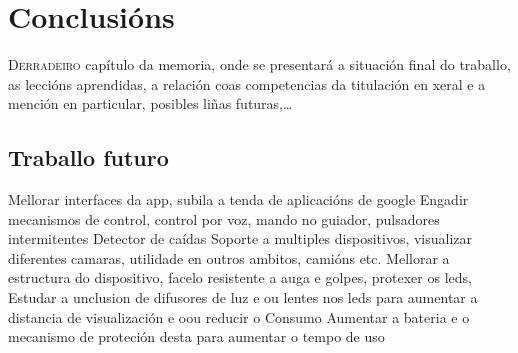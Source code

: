 \chapter{Conclusións}
\label{chap:conclusions}

\lettrine{D}{erradeiro} capítulo da memoria, onde se presentará a
situación final do traballo, as leccións aprendidas, a relación coas
competencias da titulación en xeral e a mención en particular,
posibles liñas futuras,\dots
\section{Traballo futuro}
Mellorar interfaces da app, subila a tenda de aplicacións de google
Engadir mecanismos de control, control por voz, mando no guiador, pulsadores intermitentes
Detector de caídas
Soporte a multiples dispositivos, visualizar diferentes camaras, utilidade en outros ambitos, camións etc.
Mellorar a estructura do dispositivo, facelo resistente a auga e golpes, protexer os leds,
Estudar a unclusion de difusores de luz e ou lentes nos leds para aumentar a distancia de visualización e oou reducir o Consumo
Aumentar a bateria e o mecanismo de proteción desta para aumentar o tempo de uso
